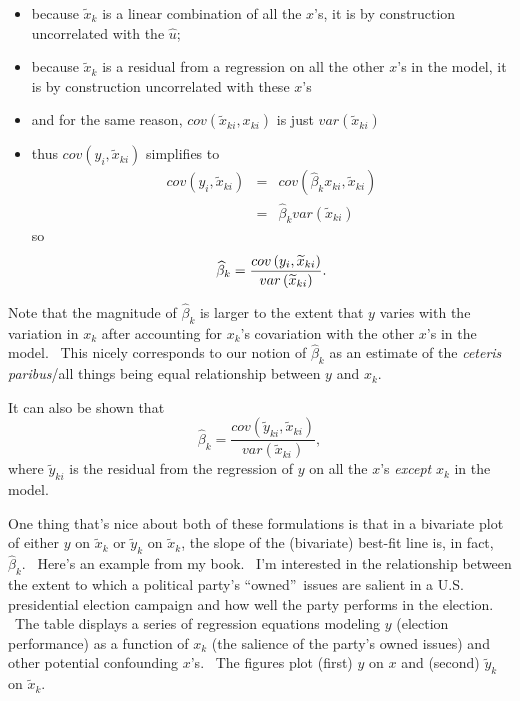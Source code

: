 \documentclass[11pt]{article}
\begin{document}
\begin{itemize}
\item because $\widetilde{x}_{k}$ is a linear combination of all the $x$'s,
it is by construction uncorrelated with the $\widehat{u}$;

\item because $\widetilde{x}_{k}$ is a residual from a regression on all the
other $x$'s in the model, it is by construction uncorrelated with these $x$'s

\item and for the same reason, $cov\left( \widetilde{x}_{ki},x_{ki}\right) $
is just $var\left( \widetilde{x}_{ki}\right) $

\item thus $cov\left( y_{i},\widetilde{x}_{ki}\right) $ simplifies to 
\begin{eqnarray*}
cov\left( y_{i},\widetilde{x}_{ki}\right) &=&cov\left( \widehat{\beta }%
_{k}x_{ki},\widetilde{x}_{ki}\right) \\
&=&\widehat{\beta }_{k}var\left( \widetilde{x}_{ki}\right)
\end{eqnarray*}%
so%
\begin{equation*}
\widehat{\beta }_{k}=\frac{cov\left( y_{i},\widetilde{x}_{ki}\right) }{%
var\left( \widetilde{x}_{ki}\right) }.
\end{equation*}
\end{itemize}

Note that the magnitude of $\widehat{\beta }_{k}$ is larger to the extent
that $y$ varies with the variation in $x_{k}$ after accounting for $x_{k}$'s
covariation with the other $x$'s in the model. \ This nicely corresponds to
our notion of $\widehat{\beta }_{k}$ as an estimate of the \textit{ceteris
paribus}/all things being equal relationship between $y$ and $x_{k}$.\bigskip

It can also be shown that 
\begin{equation*}
\widehat{\beta }_{k}=\frac{cov\left( \widetilde{y}_{ki},\widetilde{x}%
_{ki}\right) }{var\left( \widetilde{x}_{ki}\right) },
\end{equation*}%
where $\widetilde{y}_{ki}$ is the residual from the regression of $y$ on all
the $x$'s \textit{except }$x_{k}$ in the model. \bigskip

One thing that's nice about both of these formulations is that in a
bivariate plot of either $y$ on $\widetilde{x}_{k}$ or $\widetilde{y}_{k}$
on $\widetilde{x}_{k}$, the slope of the (bivariate) best-fit line is, in
fact, $\widehat{\beta }_{k}.$ \ Here's an example from my book. \ I'm
interested in the relationship between the extent to which a political
party's \textquotedblleft owned\textquotedblright\ issues are salient in a
U.S. presidential election campaign and how well the party performs in the
election. \ The table displays a series of regression equations modeling $y$
(election performance) as a function of $x_{k}$ (the salience of the party's
owned issues) and other potential confounding $x$'s. \ The figures plot
(first) $y$ on $x$ and (second) $\widetilde{y}_{k}$ on $\widetilde{x}_{k}.$
\end{document}
